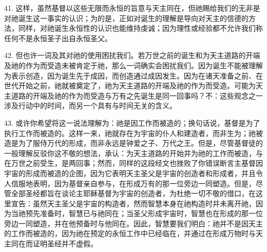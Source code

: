 41. 这样，虽然基督以这些无限而永恒的旨意与天主同在，但祂赐给我们的无非是对祂诞生这一事实的认识；为的是，正如对诞生的理解是导向对天主的信德的方法，同样，对祂诞生永恒性的认识也能维持虔诚；因为理性或经验都不允许我们称任何不是永恒圣子出自永恒圣父。\par

42. 但也许一词及其对祂的使用困扰我们。若万世之前的诞生和为天主道路的开端及祂的作为而受造未被肯定于祂，那么一词确实会困扰我们。因为诞生不能被理解为表示创造，因为诞生先于成因，而创造通过成因发生。因为在诸天准备之前、在世代开始之前，祂就被奠定了，祂为天主道路的开端及祂的作为而受造。可能为天主道路的开端及祂的作为而受造与万有之先诞生是同一回事吗？不：这些观念之一涉及行动中的时间，而另一个具有与时间无关的含义。\par

43. 或许你希望将这一说法理解为：祂是因工作而被造的；换句话说，基督是为了执行工作而被造的。这样一来，祂就存在为宇宙的仆人和建造者，而非生为；祂被造是为了服侍万代的形成，而非永远是钟爱之子、万代之王。但是，尽管基督徒的一般理解反驳你这不敬的想法，承认：为天主道路的开始并为祂的工作而被造，与在万世之前受生，是两回事；然而，同样的这段经文也挫败了你错误断言主基督因宇宙的形成而被造的企图，因为它表明天主圣父是宇宙的创造者和形成者，并且令人信服地表明，因为基督亲自参与，在形成万有的那一位旁边一同塑造。但是，尽管全部圣经都旨在谈论主耶稣基督为宇宙的创造者，为杜绝一切不敬的借口，在这里宣告：虽然天主圣父是宇宙的构造者，然而智慧本身在祂构造时并未离开祂，因为当祂预先准备时，智慧已与祂同在；当圣父形成宇宙时，智慧也在形成的那一位旁边一同塑造，并在他预备时与他同在。因此，智慧要我们明白：祂并不是因天主的工作而被造的，因为祂在预定的永恒工作中已经临在，并通过在形成万物时与天主同在而证明圣经并不虚假。\par

